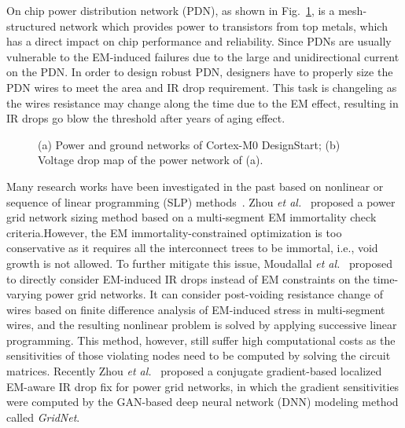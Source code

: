 On chip power distribution network (PDN), as shown in Fig.~\ref{fig:pgimage}, is a mesh-structured network which provides power to transistors from top metals,  which has a direct impact on chip performance and reliability. Since PDNs are usually vulnerable to the EM-induced failures due to the large and unidirectional current on the PDN. In order to design robust PDN, designers have to properly size the PDN wires to meet the area and IR drop requirement. This task is changeling as the wires resistance may change along the time due to the EM effect, resulting in IR drops go blow the threshold after years of aging effect.
\begin{figure}[htp]
	\centering
	\caption{(a) Power and ground networks of Cortex-M0 DesignStart; (b) Voltage drop map of the power network of (a).}
	\label{fig:pgimage}
\end{figure}
Many research works have been investigated in the past based on nonlinear or sequence of linear programming (SLP) methods~\cite{ChBr:TCAD'88,DuMa:DAC'89,Tan:DAC'99,Wang:TCAD'05,ZhouSun:TVLSI'19, Sukharev:2019pg,ZhouYu:ASPDAC'20,ZhouJin:ICCAD'20}.  Zhou {\it et al.}~\cite{ZhouSun:TVLSI'19,ZhouChen:Integration'21} proposed a power grid network sizing method based on a multi-segment EM immortality check criteria.However, the EM immortality-constrained optimization is too conservative as it requires all the interconnect trees to be immortal, i.e., void growth is not allowed.  To further mitigate this issue, Moudallal {\it et al.}~\cite{Sukharev:2019pg} proposed to directly consider EM-induced IR drops instead of EM constraints on the time-varying power grid networks. It can consider post-voiding resistance change of wires based on finite difference analysis of EM-induced stress in multi-segment wires, and the resulting nonlinear problem is solved by applying successive linear programming. This method, however, still suffer high computational costs as the sensitivities of those violating nodes need to be computed by solving the circuit matrices. Recently Zhou {\it et al.}~\cite{ZhouJin:ICCAD'20, HanLiu:TCAD'22-23} proposed a conjugate gradient-based localized EM-aware IR drop fix for power grid networks, in which the gradient sensitivities were computed by the GAN-based deep neural network (DNN) modeling method called {\it GridNet}. 

